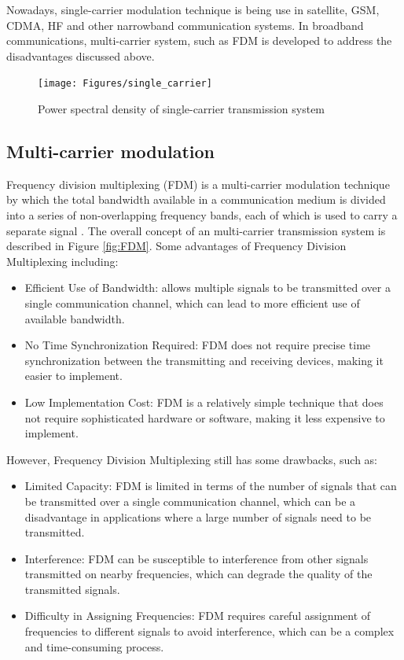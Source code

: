 Nowadays, single-carrier modulation technique is being use in satellite, GSM, CDMA, HF and other narrowband communication systems. In broadband communications, multi-carrier system, such as FDM is developed to address the disadvantages discussed above.

\begin{figure}[htbp]
    \centering
    \texttt{[image: Figures/single\_carrier]}
    \caption{Power spectral density of single-carrier transmission system}
    \label{fig:single-carrier}
\end{figure}

\subsection{Multi-carrier modulation}

Frequency division multiplexing (FDM) is a multi-carrier modulation technique by which the total bandwidth available in a communication medium is divided into a series of non-overlapping frequency bands, each of which is used to carry a separate signal \cite{b2}. The overall concept of an multi-carrier transmission system is described in Figure \ref{fig:FDM}. Some advantages of Frequency Division Multiplexing including:
\begin{itemize}
    \item Efficient Use of Bandwidth: allows multiple signals to be transmitted over a single communication channel, which can lead to more efficient use of available bandwidth.
    \item No Time Synchronization Required: FDM does not require precise time synchronization between the transmitting and receiving devices, making it easier to implement.
    \item Low Implementation Cost: FDM is a relatively simple technique that does not require sophisticated hardware or software, making it less expensive to implement.
\end{itemize}
However, Frequency Division Multiplexing still has some drawbacks, such as: 
\begin{itemize}
    \item Limited Capacity: FDM is limited in terms of the number of signals that can be transmitted over a single communication channel, which can be a disadvantage in applications where a large number of signals need to be transmitted.
    \item Interference: FDM can be susceptible to interference from other signals transmitted on nearby frequencies, which can degrade the quality of the transmitted signals.
    \item Difficulty in Assigning Frequencies: FDM requires careful assignment of frequencies to different signals to avoid interference, which can be a complex and time-consuming process.
\end{itemize}

